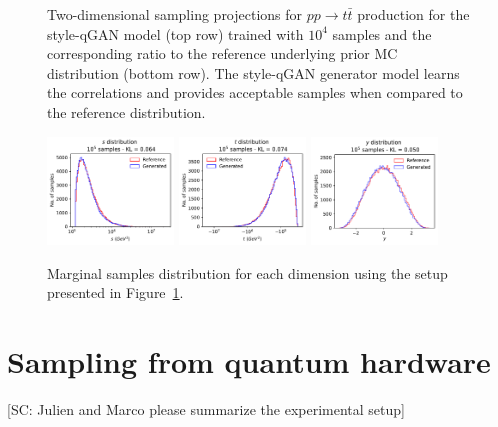 \documentclass[twocolumn,preprintnumbers,superscriptaddress]{revtex4-2}
\begin{document}
\begin{figure}
  \caption{\label{fig:ttbar}Two-dimensional sampling projections for
  $pp \rightarrow t\bar{t}$ production for the style-qGAN model (top row) trained
  with $10^4$ samples and the corresponding ratio to the reference underlying
  prior MC distribution (bottom row). The style-qGAN generator model learns the
  correlations and provides acceptable samples when compared to the reference
  distribution.}
\end{figure}

\begin{figure}

  \includegraphics[width=0.3\textwidth]{plots/LHCttbar/s-distribution_LHCdata_100k.pdf}%
  \includegraphics[width=0.3\textwidth]{plots/LHCttbar/t-distribution_LHCdata_100k.pdf}%
  \includegraphics[width=0.3\textwidth]{plots/LHCttbar/y-distribution_LHCdata_100k.pdf}

  \caption{\label{fig:ttbar_2}Marginal samples distribution for each dimension
  using the setup presented in Figure~\ref{fig:ttbar}.}
\end{figure}

\section{Sampling from quantum hardware}
\label{sec:deployment}

{\color{red}[SC: Julien and Marco please summarize the experimental
  setup]}
\end{document}
